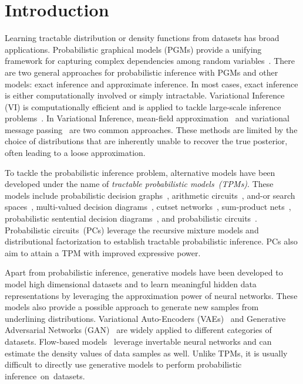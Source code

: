 \documentclass[sigconf, anonymous, review]{acmart}
\theoremstyle{plain}
\theoremstyle{definition}
\theoremstyle{remark}
\begin{document}
\maketitle

\section{Introduction}
Learning tractable  distribution or density functions from datasets has broad applications. 
Probabilistic graphical models (PGMs) provide a unifying framework for capturing complex dependencies among random variables~\cite{wainwright2008graphical}.
There are two general approaches for probabilistic inference with PGMs and other models: exact inference and approximate inference. In most cases, exact inference is either computationally involved or simply intractable. 
Variational Inference (VI) is computationally efficient and is applied to tackle  large-scale inference problems~\cite{jordan1999introduction,hoffman2013stochastic}.
In Variational Inference, mean-field approximation~\cite{xing2012generalized} and variational message passing~\cite{bishop2003vibes,winn2005variational} are two common approaches.
These  methods are limited by the choice of distributions that are inherently unable to recover the true posterior, often leading to a loose approximation. 

To tackle the probabilistic inference problem, alternative models have been developed under the name of \emph{tractable probabilistic models~(TPMs)}. These models include probabilistic decision graphs~\cite{jaeger2006learning}, arithmetic circuits~\cite{darwiche2003differential}, and-or search spaces~\cite{marinescu2005and},
multi-valued decision diagrams~\cite{dechter2007and},
cutset networks~\cite{rahman2014cutset}, sum-product nets~\cite{sanchez2021sum}, probabilistic sentential decision diagrams~\cite{kisa2014probabilistic}, and probabilistic circuits~\cite{choi2020probabilistic}. Probabilistic circuits~(PCs) leverage the recursive mixture models and distributional factorization to establish tractable probabilistic inference. PCs also aim to attain a TPM with improved expressive power. 

Apart from probabilistic inference, generative models have been developed to model high dimensional datasets and to learn   meaningful  hidden data representations by leveraging the approximation power of neural networks. These models also provide a possible approach to generate new samples from  underlining distributions. Variational Auto-Encoders (VAEs)~\cite{kingma2013auto} and Generative Adversarial Networks (GAN)~\cite{Goodfellow14} are widely applied to different categories of datasets. Flow-based models~\cite{Dinh2016DensityEU, dinh2014nice,rezende2015variational,berg2018sylvester} leverage invertable neural networks and can estimate the density values of data samples as well. Unlike TPMs, it is usually difficult to directly use generative models to perform probabilistic inference~on~datasets. 
\end{document}
